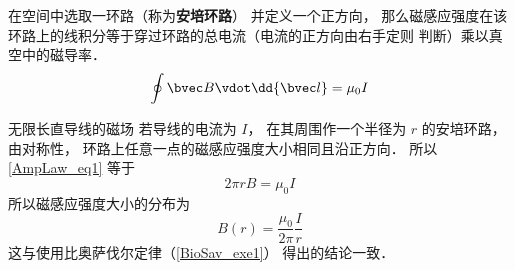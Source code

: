 
在空间中选取一环路（称为\textbf{安培环路}） 并定义一个正方向， 那么磁感应强度在该环路上的线积分等于穿过环路的总电流（电流的正方向由右手定则 判断）乘以真空中的磁导率．
\begin{equation}\label{AmpLaw_eq1}
\oint \bvec B \vdot \dd{\bvec l} = \mu_0 I
\end{equation}

\begin{example}{无限长直导线的磁场}
若导线的电流为 $I$， 在其周围作一个半径为 $r$ 的安培环路， 由对称性， 环路上任意一点的磁感应强度大小相同且沿正方向． 所以\autoref{AmpLaw_eq1} 等于
\begin{equation}
2\pi r B = \mu_0 I
\end{equation}
所以磁感应强度大小的分布为
\begin{equation}
B(r) = \frac{\mu_0}{2\pi} \frac Ir
\end{equation}
这与使用比奥萨伐尔定律（\autoref{BioSav_exe1}） 得出的结论一致．
\end{example}
